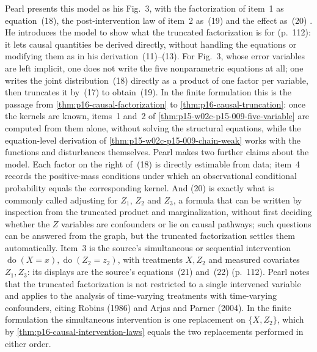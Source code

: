 Pearl presents this model as his Fig.~3, with the factorization of
item~1 as equation~(18), the post-intervention law of item~2 as~(19)
and the effect as~(20) \cite[sec.~3.2.3, pp.~111--112]{Pearl2009CausalOverview}.
He introduces the model to show what the truncated factorization is for
(p.~112): it lets causal quantities be derived directly, without handling
the equations or modifying them as in his derivation~(11)--(13). For
Fig.~3, whose error variables are left implicit, one does not write the
five nonparametric equations at all; one writes the joint distribution~(18)
directly as a product of one factor per variable, then truncates it
by~(17) to obtain~(19). In the finite formulation this is the passage from
\cref{thm:p16-causal-factorization} to \cref{thm:p16-causal-truncation}:
once the kernels are known, items~1 and~2 of
\cref{thm:p15-w02c-p15-009-five-variable} are computed from
them alone, without solving the structural equations, while the
equation-level derivation of \cref{thm:p15-w02c-p15-009-chain-weak} works
with the functions and disturbances themselves. Pearl makes two further
claims about the model. Each factor on the right of~(18) is
directly estimable from data; item~4 records the positive-mass
conditions under which an observational conditional probability equals
the corresponding kernel. And (20) is exactly what is commonly called
adjusting for \(Z_1\), \(Z_2\) and \(Z_3\), a formula that can be written
by inspection from the truncated product and marginalization, without
first deciding whether the \(Z\) variables are confounders or lie on
causal pathways; such questions can be answered from the graph, but the
truncated factorization settles them automatically.
Item~3 is the source's simultaneous or sequential intervention
\(\operatorname{do}(X=x),\operatorname{do}(Z_2=z_2)\), with
treatments \(X,Z_2\) and measured covariates \(Z_1,Z_3\): its displays
are the source's equations~(21) and~(22) (p.~112). Pearl notes that the
truncated factorization is not restricted to a single intervened
variable and applies to the analysis of time-varying treatments with
time-varying confounders, citing Robins (1986) and Arjas and Parner
(2004). In the finite formulation the simultaneous intervention is one
replacement on \(\{X,Z_2\}\), which by
\cref{thm:p16-causal-intervention-laws} equals the two replacements
performed in either order.

